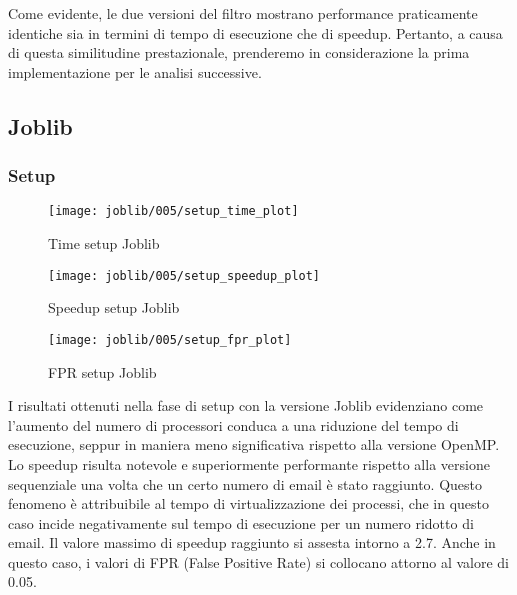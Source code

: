 Come evidente, le due versioni del filtro mostrano performance praticamente identiche sia in termini di tempo di
esecuzione che di speedup.
Pertanto, a causa di questa similitudine prestazionale, prenderemo in considerazione la prima implementazione per
le analisi successive.

\subsection{Joblib}\label{subsec:joblib-test}
\subsubsection{Setup}\label{subsubsec:joblib-setup}
\begin{figure}[H]
    \centering
    \texttt{[image: joblib/005/setup\_time\_plot]}
        \caption{Time setup Joblib}\label{fig:005-setup_time_joblib}
    \endminipage\hfill
    \texttt{[image: joblib/005/setup\_speedup\_plot]}
        \caption{Speedup setup Joblib}\label{fig:005-setup_speedup_joblib}
    \endminipage\hfill
\end{figure}
\begin{figure}[H]
    \centering
    \texttt{[image: joblib/005/setup\_fpr\_plot]}
        \caption{FPR setup Joblib}\label{fig:005-setup_fpr_joblib}
    \endminipage\hfill
\end{figure}

I risultati ottenuti nella fase di setup con la versione Joblib evidenziano come l'aumento del numero di processori
conduca a una riduzione del tempo di esecuzione, seppur in maniera meno significativa rispetto alla versione OpenMP\@.
Lo speedup risulta notevole e superiormente performante rispetto alla versione sequenziale una volta che un certo numero
di email è stato raggiunto.
Questo fenomeno è attribuibile al tempo di virtualizzazione dei processi, che in questo caso incide negativamente sul
tempo di esecuzione per un numero ridotto di email.
Il valore massimo di speedup raggiunto si assesta intorno a 2.7.
Anche in questo caso, i valori di FPR (False Positive Rate) si collocano attorno al valore di 0.05.

